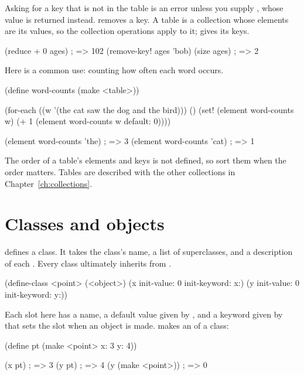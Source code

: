 Asking for a key that is not in the table is an error unless you supply
, whose value is returned instead. 
removes a key. A table is a collection whose elements are its values, so
the collection operations apply to it;  gives its keys.

\begin{dylan}
(reduce + 0 ages)                       ; => 102
(remove-key! ages 'bob)
(size ages)                             ; => 2
\end{dylan}

Here is a common use: counting how often each word occurs.

\begin{dylan}
(define word-counts (make <table>))

(for-each ((w '(the cat saw the dog and the bird)))
          ()
  (set! (element word-counts w)
        (+ 1 (element word-counts w default: 0))))

(element word-counts 'the)              ; => 3
(element word-counts 'cat)              ; => 1
\end{dylan}

The order of a table's elements and keys is not defined, so sort them when
the order matters. Tables are described with the other collections in
Chapter~\ref{ch:collections}.

\section{Classes and objects}\label{sec:tut-classes}

 defines a class. It takes the class's name, a list of
superclasses, and a description of each . Every class
ultimately inherits from .

\begin{dylan}
(define-class <point> (<object>)
  (x init-value: 0 init-keyword: x:)
  (y init-value: 0 init-keyword: y:))
\end{dylan}

Each slot here has a name, a default value given by ,
and a keyword given by  that sets the slot when an
object is made.  makes an  of a class:

\begin{dylan}
(define pt (make <point> x: 3 y: 4))

(x pt)                          ; => 3
(y pt)                          ; => 4
(y (make <point>))              ; => 0
\end{dylan}


